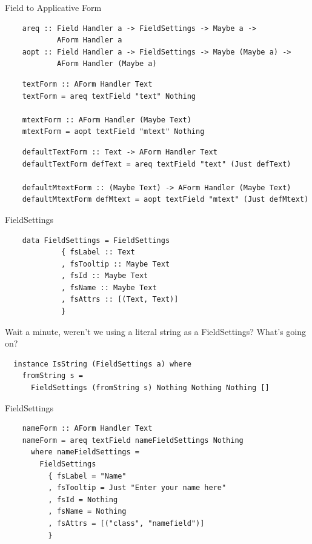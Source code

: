 \documentclass[pdf]{beamer}
\begin{document}
\begin{frame}[fragile]{Field to Applicative Form}
  \begin{verbatim}
    areq :: Field Handler a -> FieldSettings -> Maybe a ->
            AForm Handler a
    aopt :: Field Handler a -> FieldSettings -> Maybe (Maybe a) ->
            AForm Handler (Maybe a)
  \end{verbatim}
  \pause
  \begin{verbatim}
    textForm :: AForm Handler Text
    textForm = areq textField "text" Nothing

    mtextForm :: AForm Handler (Maybe Text)
    mtextForm = aopt textField "mtext" Nothing
  \end{verbatim}
  \pause
  \begin{verbatim}
    defaultTextForm :: Text -> AForm Handler Text
    defaultTextForm defText = areq textField "text" (Just defText)

    defaultMtextForm :: (Maybe Text) -> AForm Handler (Maybe Text)
    defaultMtextForm defMtext = aopt textField "mtext" (Just defMtext)
  \end{verbatim}
\end{frame}

\begin{frame}[fragile]{FieldSettings}
  \begin{verbatim}
    data FieldSettings = FieldSettings
             { fsLabel :: Text
             , fsTooltip :: Maybe Text
             , fsId :: Maybe Text
             , fsName :: Maybe Text
             , fsAttrs :: [(Text, Text)]
             }
  \end{verbatim}
  \pause
  Wait a minute, weren't we using a literal string as a FieldSettings? What's going on?
  \pause
  \begin{verbatim}
  instance IsString (FieldSettings a) where
    fromString s =
      FieldSettings (fromString s) Nothing Nothing Nothing []
  \end{verbatim}
\end{frame}

\begin{frame}[fragile]{FieldSettings}
  \begin{verbatim}
    nameForm :: AForm Handler Text
    nameForm = areq textField nameFieldSettings Nothing
      where nameFieldSettings =
        FieldSettings
          { fsLabel = "Name"
          , fsTooltip = Just "Enter your name here"
          , fsId = Nothing
          , fsName = Nothing
          , fsAttrs = [("class", "namefield")]
          }
  \end{verbatim}
\end{frame}
\end{document}
